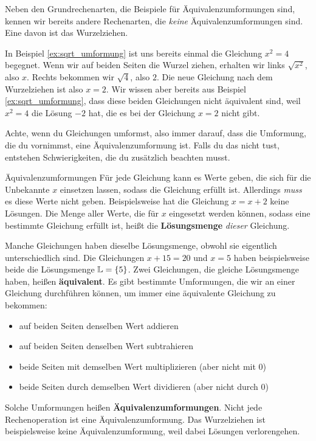 \documentclass[../../main.tex]{subfiles}
\begin{document}
Neben den Grundrechenarten, die Beispiele für Äquivalenzumformungen sind, kennen wir bereits andere Rechenarten, die \emph{keine} Äquivalenzumformungen sind. Eine davon ist das Wurzelziehen.

\begin{example}
    In Beispiel \ref{ex:sqrt_umformung} ist uns bereits einmal die Gleichung $x^2=4$ begegnet. Wenn wir auf beiden Seiten die Wurzel ziehen, erhalten wir links $\sqrt{x^2}$, also $x$. Rechts bekommen wir $\sqrt{4}$, also $2$. Die neue Gleichung nach dem Wurzelziehen ist also $x=2$. Wir wissen aber bereits aus Beispiel \ref{ex:sqrt_umformung}, dass diese beiden Gleichungen nicht äquivalent sind, weil $x^2=4$ die Lösung $-2$ hat, die es bei der Gleichung $x=2$ nicht gibt.
\end{example}

Achte, wenn du Gleichungen umformst, also immer darauf, dass die Umformung, die du vornimmst, eine Äquivalenzumformung ist. Falls du das nicht tust, entstehen Schwierigkeiten, die du zusätzlich beachten musst.

\begin{nutshell}{Äquivalenzumformungen}
    Für jede Gleichung kann es Werte geben, die sich für die Unbekannte $x$ einsetzen lassen, sodass die Gleichung erfüllt ist. Allerdings \emph{muss} es diese Werte nicht geben. Beispielsweise hat die Gleichung $x=x+2$ keine Lösungen. Die Menge aller Werte, die für $x$ eingesetzt werden können, sodass eine bestimmte Gleichung erfüllt ist, heißt die \textbf{Lösungsmenge} \Solutions \emph{dieser} Gleichung.
    
    Manche Gleichungen haben dieselbe Lösungsmenge, obwohl sie eigentlich unterschiedlich sind. Die Gleichungen $x+15=20$ und $x=5$ haben beispielsweise beide die Lösungsmenge $\mathbb{L}=\{5\}$. Zwei Gleichungen, die gleiche Lösungsmenge haben, heißen \textbf{äquivalent}. Es gibt bestimmte Umformungen, die wir an einer Gleichung durchführen können, um immer eine äquivalente Gleichung zu bekommen:
    \begin{itemize}
        \item auf beiden Seiten denselben Wert addieren
        \item auf beiden Seiten denselben Wert subtrahieren
        \item beide Seiten mit demselben Wert multiplizieren (aber nicht mit 0)
        \item beide Seiten durch demselben Wert dividieren (aber nicht durch 0)
    \end{itemize}
    Solche Umformungen heißen \textbf{Äquivalenzumformungen}. Nicht jede Rechenoperation ist eine Äquivalenzumformung. Das Wurzelziehen ist beispielsweise keine Äquivalenzumformung, weil dabei Lösungen verlorengehen.
\end{nutshell}
\end{document}
